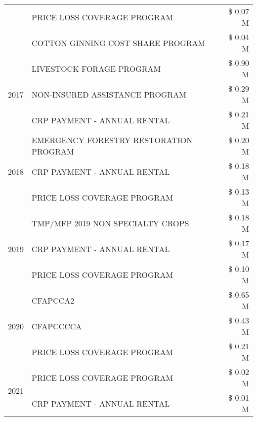 \begin{tabular}{llr}
 & PRICE LOSS COVERAGE PROGRAM                   & \$ 0.07 M \\
 & COTTON GINNING COST SHARE PROGRAM             & \$ 0.04 M \\
\cline{1-3}
\multirow[t]{3}{*}{2017} & LIVESTOCK FORAGE PROGRAM & \$ 0.90 M \\
 & NON-INSURED ASSISTANCE PROGRAM & \$ 0.29 M \\
 & CRP PAYMENT - ANNUAL RENTAL & \$ 0.21 M \\
\cline{1-3}
\multirow[t]{3}{*}{2018} & EMERGENCY FORESTRY RESTORATION PROGRAM & \$ 0.20 M \\
 & CRP PAYMENT - ANNUAL RENTAL & \$ 0.18 M \\
 & PRICE LOSS COVERAGE PROGRAM & \$ 0.13 M \\
\cline{1-3}
\multirow[t]{3}{*}{2019} & TMP/MFP 2019 NON SPECIALTY CROPS & \$ 0.18 M \\
 & CRP PAYMENT - ANNUAL RENTAL & \$ 0.17 M \\
 & PRICE LOSS COVERAGE PROGRAM & \$ 0.10 M \\
\cline{1-3}
\multirow[t]{3}{*}{2020} & CFAPCCA2 & \$ 0.65 M \\
 & CFAPCCCCA & \$ 0.43 M \\
 & PRICE LOSS COVERAGE PROGRAM & \$ 0.21 M \\
\cline{1-3}
\multirow[t]{2}{*}{2021} & PRICE LOSS COVERAGE PROGRAM & \$ 0.02 M \\
 & CRP PAYMENT - ANNUAL RENTAL & \$ 0.01 M \\
\cline{1-3}
\bottomrule
\end{tabular}
